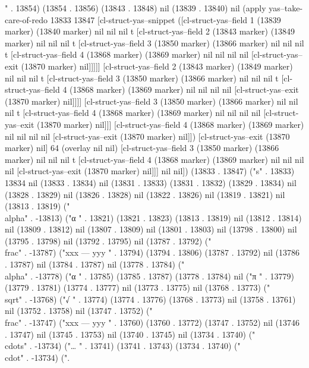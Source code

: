 {" . 13854) (13854 . 13856) (13843 . 13848) nil (13839 . 13840) nil (apply yas--take-care-of-redo 13833 13847 [cl-struct-yas--snippet ([cl-struct-yas--field 1 (13839 marker) (13840 marker) nil nil nil t [cl-struct-yas--field 2 (13843 marker) (13849 marker) nil nil nil t [cl-struct-yas--field 3 (13850 marker) (13866 marker) nil nil nil t [cl-struct-yas--field 4 (13868 marker) (13869 marker) nil nil nil nil [cl-struct-yas--exit (13870 marker) nil]]]]] [cl-struct-yas--field 2 (13843 marker) (13849 marker) nil nil nil t [cl-struct-yas--field 3 (13850 marker) (13866 marker) nil nil nil t [cl-struct-yas--field 4 (13868 marker) (13869 marker) nil nil nil nil [cl-struct-yas--exit (13870 marker) nil]]]] [cl-struct-yas--field 3 (13850 marker) (13866 marker) nil nil nil t [cl-struct-yas--field 4 (13868 marker) (13869 marker) nil nil nil nil [cl-struct-yas--exit (13870 marker) nil]]] [cl-struct-yas--field 4 (13868 marker) (13869 marker) nil nil nil nil [cl-struct-yas--exit (13870 marker) nil]]) [cl-struct-yas--exit (13870 marker) nil] 64 (overlay nil nil) [cl-struct-yas--field 3 (13850 marker) (13866 marker) nil nil nil t [cl-struct-yas--field 4 (13868 marker) (13869 marker) nil nil nil nil [cl-struct-yas--exit (13870 marker) nil]]] nil nil]) (13833 . 13847) ("s" . 13833) 13834 nil (13833 . 13834) nil (13831 . 13833) (13831 . 13832) (13829 . 13834) nil (13828 . 13829) nil (13826 . 13828) nil (13822 . 13826) nil (13819 . 13821) nil (13813 . 13819) ("\\alpha" . -13813) ("α
" . 13821) (13821 . 13823) (13813 . 13819) nil (13812 . 13814) nil (13809 . 13812) nil (13807 . 13809) nil (13801 . 13803) nil (13798 . 13800) nil (13795 . 13798) nil (13792 . 13795) nil (13787 . 13792) ("\\frac" . -13787) ("xxx
---
yyy
" . 13794) (13794 . 13806) (13787 . 13792) nil (13786 . 13787) nil (13784 . 13787) nil (13778 . 13784) ("\\alpha" . -13778) ("α
" . 13785) (13785 . 13787) (13778 . 13784) nil ("π
" . 13779) (13779 . 13781) (13774 . 13777) nil (13773 . 13775) nil (13768 . 13773) ("\\sqrt" . -13768) ("√
" . 13774) (13774 . 13776) (13768 . 13773) nil (13758 . 13761) nil (13752 . 13758) nil (13747 . 13752) ("\\frac" . -13747) ("xxx
---
yyy
" . 13760) (13760 . 13772) (13747 . 13752) nil (13746 . 13747) nil (13745 . 13753) nil (13740 . 13745) nil (13734 . 13740) ("\\cdots" . -13734) ("…
" . 13741) (13741 . 13743) (13734 . 13740) ("\\cdot" . -13734) (".
}

